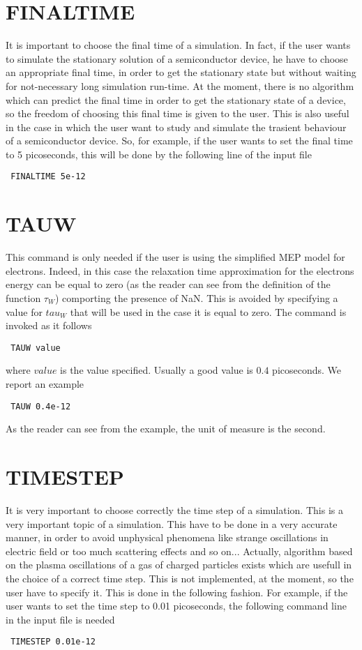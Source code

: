 \documentclass[12pt]{book}
\begin{document}
\section{FINALTIME}

It is important to choose the final time of a simulation. In fact, if the user wants to simulate the stationary solution of a semiconductor device, he have to choose an appropriate final time, in order to get the stationary state but without waiting for not-necessary long simulation run-time. At the moment, there is no algorithm which can predict the final time in order to get the stationary state of a device, so the freedom of choosing this final time is given to the user. This is also useful in the case in which the user want to study and simulate the trasient behaviour of a semiconductor device.
So, for example, if the user wants to set the final time to 5 picoseconds, this will be done by the following line of the input file
\begin{verbatim}
 FINALTIME 5e-12
\end{verbatim}

\section{TAUW}
This command is only needed if the user is using the simplified MEP model for electrons. Indeed, in this case the relaxation time approximation for the electrons energy can be equal to zero (as the reader can see from the definition of the function $\tau_W$) comporting the presence of NaN. This is avoided by specifying a value for $tau_W$ that will be used in the case it is equal to zero. The command is invoked as it follows
\begin{verbatim}
 TAUW value
\end{verbatim}
where $value$ is the value specified. Usually a good value is $0.4$ picoseconds. We report an example
\begin{verbatim}
 TAUW 0.4e-12
\end{verbatim}
As the reader can see from the example, the unit of measure is the second.

\section{TIMESTEP}

It is very important to choose correctly the time step of a simulation. This is a very important topic of a simulation. This have to be done in a very accurate manner, in order to avoid unphysical phenomena like strange oscillations in electric field or too much scattering effects and so on...
Actually, algorithm based on the plasma oscillations of a gas of charged particles exists which are usefull in the choice of a correct time step. This is not implemented, at the moment, so the user have to specify it. This is done in the following fashion. For example, if the user wants to set the time step to 0.01 picoseconds, the following command line in the input file is needed
\begin{verbatim}
 TIMESTEP 0.01e-12
\end{verbatim}
\end{document}
